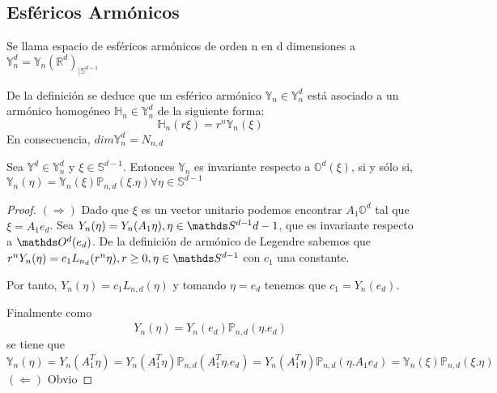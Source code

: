 \subsection{Esféricos Armónicos}
\begin{defn}
Se llama espacio de esféricos armónicos de orden n en d dimensiones a	$\mathds{Y}^d_n = \mathds{Y}_n(\mathds{R}^d)_{|\mathds{S}^{d-1}}$ 
\end{defn}
De la definición se deduce que un esférico armónico $\mathds{Y}_n \in \mathds{Y}^d_n$ está asociado a un armónico homogéneo $\mathds{H}_n \in \mathds{Y}^d_n$ de la siguiente forma:
$$
\mathds{H}_n(r\xi) = r^n\mathds{Y}_n(\xi)
$$
En consecuencia, $dim \mathds{Y}^d_n= N_{n,d}$
\begin{thm}\label{thm:1}Sea $\mathds{Y}^d \in \mathds{Y}^d_n$ y $\xi\in\mathds{S}^{d-1}$. Entonces $\mathds{Y}_n$ es invariante respecto a $\mathds{O}^d(\xi)$, si y sólo si, $\mathds{Y}_n(\eta)=\mathds{Y}_n(\xi)\mathds{P}_{n,d}(\xi.\eta)    \forall \eta\in\mathds{S}^{d-1}$
\end{thm}
\begin{proof}
$(\Rightarrow)$ Dado que $\xi$ es un vector unitario podemos encontrar $A_1 \mathds{O}^d$ tal que $\xi = A_1e_d$. Sea $\overset{~}{Y_n(\eta)} = Y_n(A_1\eta),\eta\in\sphere{d-1}$, que es invariante respecto a $\orto(e_d)$. De la definición de armónico de Legendre sabemos que $r^n\overset{~}{Y_n(\eta)} = c_1L_{n_d}(r^n\eta), r\ge0, \eta\in\sphere$ con $c_1$ una constante.
\medskip

Por tanto, $\overset{~}{Y_n(\eta)} = c_1 L_{n,d}(\eta)$ y tomando $\eta = e_d$ tenemos que $c_1 = \overset{~}{Y_n(e_d)}$.

\medskip
Finalmente como 
$$
\overset{~}{Y_n(\eta)} = \overset{~}{Y_n(e_d)}\mathds{P}_{n,d}(\eta.e_d)
$$
se tiene que
$$
\mathds{Y}_n(\eta)=\overset{~}{Y_n(A_1^T\eta)}=Y_n(A_1^T\eta)\mathds{P}_{n,d}(A_1^T\eta.e_d)=Y_n(A_1^T\eta)\mathds{P}_{n,d}(\eta.A_1e_d) = \mathds{Y}_n(\xi)\mathds{P}_{n,d}(\xi.\eta)
$$
$(\Leftarrow)$ Obvio
\end{proof}

